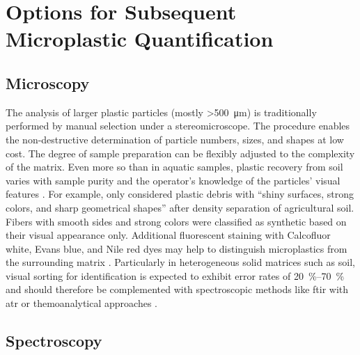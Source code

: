 \section{Options for Subsequent Microplastic Quantification}
\label{sec:analytical-techniques:analysis}

\subsection{Microscopy}
\label{sec:analytical-techniques:microscopy}

The analysis of larger plastic particles (mostly \SI{>500}{\micro\meter})
is traditionally performed by manual selection under a stereomicroscope. The procedure enables the non-destructive determination of particle numbers, sizes, and shapes at low cost. The degree of sample preparation can be flexibly adjusted to the complexity of the matrix. Even more so than in aquatic samples, plastic recovery from soil varies with sample purity and the operator's knowledge of the particles' visual features \citep{LusherIt2020,FilellaQuestions2015,ZhangDistribution2020}. For example, \citet{CorradiniPredicting2019} only considered plastic debris with ``shiny surfaces, strong colors, and sharp geometrical shapes'' after density separation of agricultural soil. Fibers with smooth sides and strong colors were classified as synthetic based on their visual appearance only. Additional fluorescent staining with Calcofluor white, Evans blue, and Nile red dyes may help to distinguish microplastics from the surrounding matrix \citep{HelmbergerCounterstaining2020,NelDetection2021}. Particularly in heterogeneous solid matrices such as soil, visual sorting for identification is expected to exhibit error rates of \SIrange{20}{70}{\percent} \citep{BlasingPlastics2018} and should therefore be complemented with spectroscopic methods like \ac{ftir} with \ac{atr} or themoanalytical approaches \citep{HeMicroplastics2018}.

\subsection{Spectroscopy}
\label{sec:analytical-techniques:spectroscopy}

